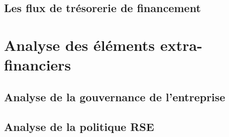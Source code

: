 \documentclass[12pt]{article}
\begin{document}
\subsection{Les flux de trésorerie de financement}

\section{Analyse des éléments extra-financiers}
\subsection{Analyse de la gouvernance de l'entreprise}
\subsection{Analyse de la politique RSE}
\end{document}
